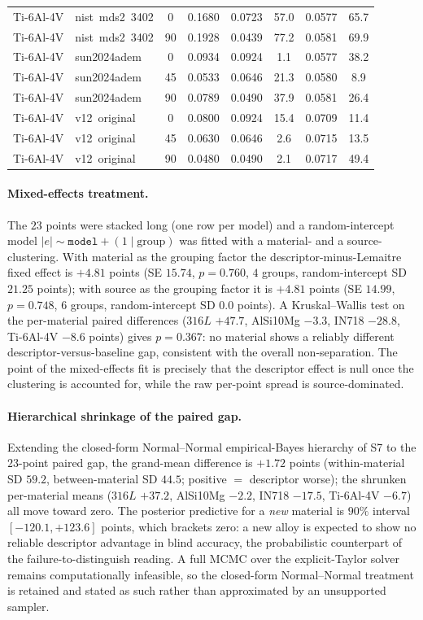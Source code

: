 \documentclass[11pt,a4paper,twocolumn]{article}
\begin{document}
\begin{table}[htbp]
\begin{tabular}{llc c cc cc}
Ti-6Al-4V & nist~mds2~3402 & 0 & 0.1680 & 0.0723 & 57.0 & 0.0577 & 65.7 \\
Ti-6Al-4V & nist~mds2~3402 & 90 & 0.1928 & 0.0439 & 77.2 & 0.0581 & 69.9 \\
Ti-6Al-4V & sun2024adem & 0 & 0.0934 & 0.0924 & 1.1 & 0.0577 & 38.2 \\
Ti-6Al-4V & sun2024adem & 45 & 0.0533 & 0.0646 & 21.3 & 0.0580 & 8.9 \\
Ti-6Al-4V & sun2024adem & 90 & 0.0789 & 0.0490 & 37.9 & 0.0581 & 26.4 \\
Ti-6Al-4V & v12~original & 0 & 0.0800 & 0.0924 & 15.4 & 0.0709 & 11.4 \\
Ti-6Al-4V & v12~original & 45 & 0.0630 & 0.0646 & 2.6 & 0.0715 & 13.5 \\
Ti-6Al-4V & v12~original & 90 & 0.0480 & 0.0490 & 2.1 & 0.0717 & 49.4 \\
\bottomrule
\end{tabular}
\end{table}

\paragraph{Mixed-effects treatment.}
The $23$ points were stacked long (one row per model) and a random-intercept model
$\lvert e \rvert \sim \texttt{model} + (1\mid\text{group})$ was fitted with a material- and a source-clustering.
With material as the grouping factor the descriptor-minus-Lemaitre fixed effect is $+4.81$ points
(SE $15.74$, $p = 0.760$, $4$ groups, random-intercept SD $21.25$ points); with source as the grouping factor it is
$+4.81$ points (SE $14.99$, $p = 0.748$, $6$ groups, random-intercept SD $0.0$ points). A Kruskal--Wallis test on
the per-material paired differences ($316L$ $+47.7$, AlSi10Mg $-3.3$, IN718 $-28.8$, Ti-6Al-4V $-8.6$ points)
gives $p = 0.367$: no material shows a reliably different descriptor-versus-baseline gap, consistent with the
overall non-separation. The point of the mixed-effects fit is precisely that the descriptor effect is null once
the clustering is accounted for, while the raw per-point spread is source-dominated.

\paragraph{Hierarchical shrinkage of the paired gap.}
Extending the closed-form Normal--Normal empirical-Bayes hierarchy of S7 to the $23$-point paired gap, the
grand-mean difference is $+1.72$ points (within-material SD $59.2$, between-material SD $44.5$; positive $=$
descriptor worse); the shrunken per-material means ($316L$ $+37.2$, AlSi10Mg $-2.2$, IN718 $-17.5$, Ti-6Al-4V
$-6.7$) all move toward zero. The posterior predictive for a \emph{new} material is $90\%$ interval
$[-120.1, +123.6]$ points, which brackets zero: a
new alloy is expected to show no reliable descriptor advantage in blind accuracy, the probabilistic counterpart
of the failure-to-distinguish reading. A full MCMC over the explicit-Taylor solver remains computationally
infeasible, so the closed-form Normal--Normal treatment is retained and stated as such rather than approximated
by an unsupported sampler.
\end{document}
